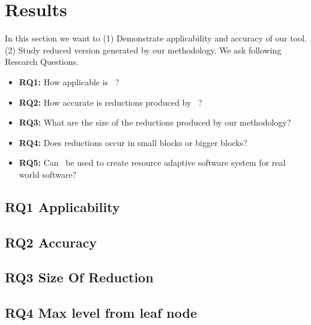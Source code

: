 \section{Results}
In this section we want to (1) Demonstrate applicability and accuracy of our tool. (2) Study reduced version generated by our methodology. We ask following Research Questions.


\begin{itemize}
\renewcommand{\labelitemi}{$\bullet$}
\item \textbf{RQ1:} How applicable is \mytool\ ?
\item \textbf{RQ2:} How accurate is reductions produced by \mytool\ ?
\item \textbf{RQ3:} What are the size of the reductions produced by our methodology?
\item \textbf{RQ4:} Does reductions occur in small blocks or bigger blocks?
\item \textbf{RQ5:} Can \mytool\ be used to create resource adaptive software system for real world software?
\end{itemize}


\subsection{RQ1 Applicability}
\label{sec:applicability}



\subsection{RQ2 Accuracy}
\label{sec:accuracy}


\subsection{RQ3 Size Of Reduction}
\label{sec:reductionsize}



\subsection{RQ4 Max level from leaf node}
\label{sec:leafnodelevel}
